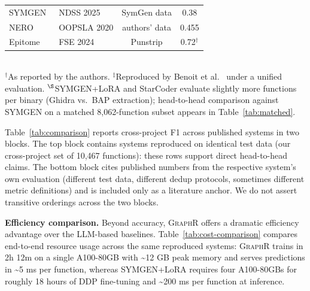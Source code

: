 \documentclass[sigconf,nonacm]{acmart}
\newcommand{\sysname}{\textsc{GraphR}}
\begin{document}
\begin{table}[t]
\begin{tabular}{llcc}
        SYMGEN~\cite{symgen} & NDSS 2025 & SymGen data & 0.38 \\
        NERO~\cite{nero} & OOPSLA 2020 & authors' data & 0.455 \\
        Epitome~\cite{epitome} & FSE 2024 & Punstrip & 0.72$^\dagger$ \\
        \bottomrule
    \end{tabular}
    \\[0.3em]
    \footnotesize$^\dagger$As reported by the authors. $^\ddagger$Reproduced by Benoit et al.~\cite{blens} under a unified evaluation. $^\S$SYMGEN+LoRA and StarCoder evaluate slightly more functions per binary (Ghidra vs.\ BAP extraction); head-to-head comparison against SYMGEN on a matched 8{,}062-function subset appears in Table~\ref{tab:matched}.
\end{table}

Table~\ref{tab:comparison} reports cross-project F1 across published systems in two blocks. The top block contains systems reproduced on identical test data (our cross-project set of 10{,}467 functions): these rows support direct head-to-head claims. The bottom block cites published numbers from the respective system's own evaluation (different test data, different dedup protocols, sometimes different metric definitions) and is included only as a literature anchor. We do not assert transitive orderings across the two blocks.

\textbf{Efficiency comparison.} Beyond accuracy, \sysname{} offers a dramatic efficiency advantage over the LLM-based baselines. Table~\ref{tab:cost-comparison} compares end-to-end resource usage across the same reproduced systems: \sysname{} trains in 2h 12m on a single A100-80GB with \textasciitilde{}12 GB peak memory and serves predictions in \textasciitilde{}5 ms per function, whereas SYMGEN+LoRA requires four A100-80GBs for roughly 18 hours of DDP fine-tuning and \textasciitilde{}200 ms per function at inference.
\end{document}
